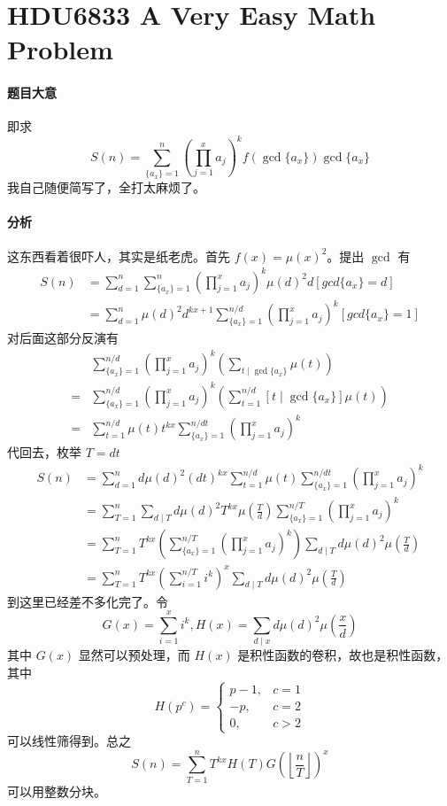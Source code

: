\section{HDU6833 A Very Easy Math Problem}

\paragraph{题目大意}

即求
\[ S (n) = \sum^n_{\{ a_x \} = 1} \left( \prod_{j = 1}^x a_j \right)^k f (\gcd \{ a_x \}) \gcd \{ a_x \} \]
我自己随便简写了，全打太麻烦了。

\paragraph{分析}

这东西看着很吓人，其实是纸老虎。首先 $f(x) = \mu(x)^2$。提出 $\gcd$ 有
\[ \begin{aligned}
S (n) & =\sum_{d=1}^{n}\sum^{n}_{\{ a_{x}\}=1}(\prod_{j=1}^{x}a_{j})^{k}{\mu}(d)^{2}d [gcd \{ a_{x}\} =d]\\
& =\sum_{d=1}^{n}{\mu}(d)^{2}d^{k x+1}\sum^{n/d}_{\{ a_{x}\} =1}(\prod_{j=1}^{x}a_{j})^{k}[gcd \{ a_{x}\} =1]
\end{aligned} \]
对后面这部分反演有
\[ \begin{aligned}
& \sum^{n / d}_{\{ a_x \} = 1} \left( \prod_{j = 1}^x a_j \right)^k \left( \sum_{t \mid \gcd \{ a_x \}} \mu (t) \right)\\
= & \sum^{n / d}_{\{ a_x \} = 1} \left( \prod_{j = 1}^x a_j \right)^k \left( \sum_{t = 1}^{n / d} [t \mid \gcd \{ a_x \}] \mu (t) \right)\\
= & \sum_{t = 1}^{n / d} \mu (t) t^{k x} \sum^{n / d t}_{\{ a_x \} = 1} \left( \prod_{j = 1}^x a_j \right)^k
\end{aligned} \]
代回去，枚举 $T = d t$
\[ \begin{aligned}
S (n) & = \sum_{d = 1}^n d \mu (d)^2 (d t)^{k x} \sum_{t = 1}^{n / d} \mu (t) \sum^{n / d t}_{\{ a_x \} = 1} \left( \prod_{j = 1}^x a_j \right)^k\\
& = \sum_{T = 1}^n \sum_{d \mid T} d \mu (d)^2 T^{k x} \mu \left(\frac{T}{d} \right) \sum^{n / T}_{\{ a_x \} = 1} \left( \prod_{j = 1}^x a_j \right)^k\\
& = \sum_{T = 1}^n T^{k x} \left( \sum^{n / T}_{\{ a_x \} = 1} \left( \prod_{j = 1}^x a_j \right)^k \right) \sum_{d \mid T} d \mu (d)^2 \mu \left( \frac{T}{d} \right)\\
& = \sum_{T = 1}^n T^{k x} \left( \sum^{n / T}_{i = 1} i^k \right)^x \sum_{d \mid T} d \mu (d)^2 \mu \left( \frac{T}{d} \right)
\end{aligned} \]
到这里已经差不多化完了。令
\[ G (x) = \sum^x_{i = 1} i^k, H (x) = \sum_{d \mid x} d \mu (d)^2 \mu \left( \frac{x}{d} \right) \]
其中 $G (x)$ 显然可以预处理，而 $H (x)$ 是积性函数的卷积，故也是积性函数，其中
\[ H (p^c) = \begin{cases}
p - 1,& c = 1\\
-p, & c = 2  \\
0, & c > 2
\end{cases} \]
可以线性筛得到。总之
\[ S (n) = \sum_{T = 1}^n T^{k x} H (T) G \left( \left\lfloor \frac{n}{T} \right\rfloor \right)^x \]
可以用整数分块。


